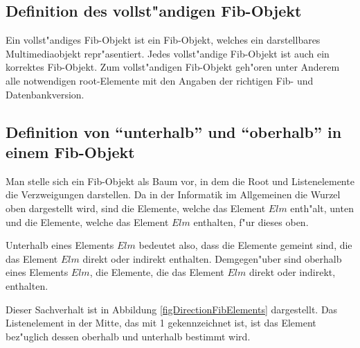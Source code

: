 \subsection{Definition des vollst"andigen Fib-Objekt}
\label{secFullFibObject}

Ein vollst"andiges Fib-Objekt ist ein Fib-Objekt, welches ein darstellbares Multimediaobjekt repr"asentiert. Jedes vollst"andige Fib-Objekt ist auch ein korrektes Fib-Objekt. Zum vollst"andigen Fib-Objekt geh"oren unter Anderem alle notwendigen root-Elemente mit den Angaben der richtigen Fib- und Datenbankversion.


\subsection{Definition von ``unterhalb'' und ``oberhalb'' in einem Fib-Objekt}
\label{secDefinitionUpDown}

Man stelle sich ein Fib-Objekt als Baum vor, in dem die Root und Listenelemente die Verzweigungen darstellen.
Da in der Informatik im Allgemeinen die Wurzel oben dargestellt wird, sind die Elemente, welche das Element $Elm$ enth"alt, unten und die Elemente, welche das Element $Elm$ enthalten, f"ur dieses oben.

Unterhalb eines Elements $Elm$ bedeutet also, dass die Elemente gemeint sind, die das Element $Elm$ direkt oder indirekt enthalten.
Demgegen"uber sind oberhalb eines Elements $Elm$, die Elemente, die das Element $Elm$ direkt oder indirekt, enthalten.

Dieser Sachverhalt ist in Abbildung \ref{figDirectionFibElements} dargestellt. Das Listenelement in der Mitte, das mit 1 gekennzeichnet ist, ist das Element bez"uglich dessen oberhalb und unterhalb bestimmt wird.

